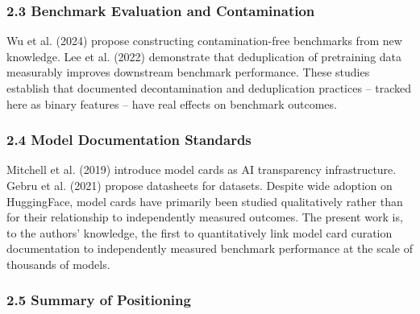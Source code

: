 \subsubsection{2.3 Benchmark Evaluation and Contamination}

Wu et al. (2024) propose constructing contamination-free benchmarks from new knowledge. Lee et al. (2022) demonstrate that deduplication of pretraining data measurably improves downstream benchmark performance. These studies establish that documented decontamination and deduplication practices -- tracked here as binary features -- have real effects on benchmark outcomes.

\subsubsection{2.4 Model Documentation Standards}

Mitchell et al. (2019) introduce model cards as AI transparency infrastructure. Gebru et al. (2021) propose datasheets for datasets. Despite wide adoption on HuggingFace, model cards have primarily been studied qualitatively rather than for their relationship to independently measured outcomes. The present work is, to the authors' knowledge, the first to quantitatively link model card curation documentation to independently measured benchmark performance at the scale of thousands of models.

\subsubsection{2.5 Summary of Positioning}

\begin{table}[htbp]
\centering
{}
\end{table}
